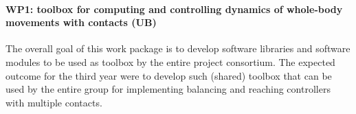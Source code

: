 \paragraph{WP1: toolbox for computing and controlling dynamics of whole-body movements with contacts (UB)}

The overall goal of this work package is to develop software libraries and
software modules to be used as toolbox by the entire project consortium.  The
expected outcome for the third year were to develop such (shared) toolbox
that can be used by the entire group for implementing balancing and reaching
controllers with multiple contacts.

